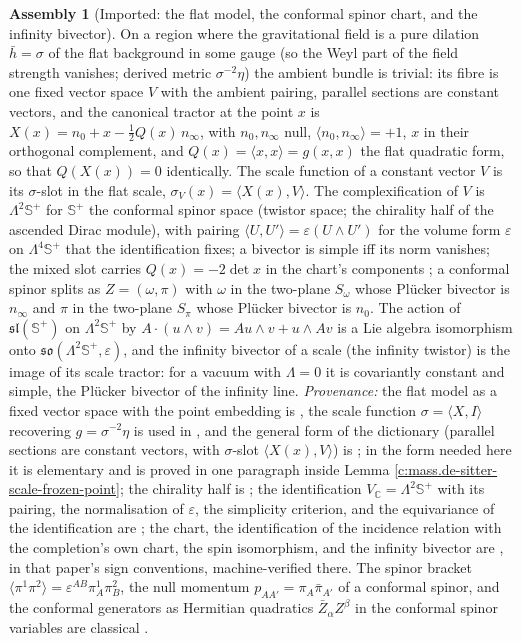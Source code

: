 \documentclass[11pt]{article}
\theoremstyle{definition}
\newtheorem{assembled}[theorem]{Assembly}
\theoremstyle{plain}
\newcommand{\changedmark}[2]{\marginpar{\raggedright\scriptsize\color{#1}#2}}
\providecommand{\C}{}\renewcommand{\C}{\mathbb{C}}
\providecommand{\CS}{}\renewcommand{\CS}{{\mathbb{S}^{+}}}
\providecommand{\Som}{}\renewcommand{\Som}{S_\omega}
\providecommand{\Spi}{}\renewcommand{\Spi}{S_\pi}
\providecommand{\hb}{}\renewcommand{\hb}{\bar{h}}
\providecommand{\br}{}\renewcommand{\br}[1]{\langle #1\rangle}
\providecommand{\ip}{}\renewcommand{\ip}[2]{\langle #1, #2\rangle}
\begin{document}
\begin{assembled}[Imported: the flat model, the conformal spinor chart, and the infinity bivector]\label{c:mass.imported-flat-model-twistor-chart-infinity}
\changedmark{gray}{reworded}
On a region where the gravitational field is a pure dilation $\hb = \sigma$ of the flat background in some gauge (so the Weyl part of the field strength vanishes; derived metric $\sigma^{-2}\eta$) the ambient bundle is trivial: its fibre is one fixed vector space $V$ with the ambient pairing, parallel sections are constant vectors, and the canonical tractor at the point $x$ is $X(x) = n_{0} + x - \tfrac12 Q(x)\, n_{\infty}$, with $n_{0}, n_{\infty}$ null, $\ip{n_{0}}{n_{\infty}} = +1$, $x$ in their orthogonal complement, and $Q(x) = \ip{x}{x} = g(x,x)$ the flat quadratic form, so that $Q(X(x)) = 0$ identically. The scale function of a constant vector $V$ is its $\sigma$-slot in the flat scale, $\sigma_{V}(x) = \ip{X(x)}{V}$. The complexification of $V$ is $\Lambda^{2}\CS$ for $\CS$ the conformal spinor space (twistor space; the chirality half of the ascended Dirac module), with pairing $\ip{U}{U'} = \varepsilon(U \wedge U')$ for the volume form $\varepsilon$ on $\Lambda^{4}\CS$ that the identification fixes; a bivector is simple iff its norm vanishes; the mixed slot carries $Q(x) = -2\det x$ in the chart's components \cite[Thm.~4.2(2)]{ButlerT9}; a conformal spinor splits as $Z = (\omega, \pi)$ with $\omega$ in the two-plane $\Som$ whose Pl\"ucker bivector is $n_{\infty}$ and $\pi$ in the two-plane $\Spi$ whose Pl\"ucker bivector is $n_{0}$. The action of $\mathfrak{sl}(\CS)$ on $\Lambda^{2}\CS$ by $A\cdot(u \wedge v) = Au \wedge v + u \wedge Av$ is a Lie algebra isomorphism onto $\mathfrak{so}(\Lambda^{2}\CS, \varepsilon)$, and the infinity bivector of a scale (the infinity twistor) is the image of its scale tractor: for a vacuum with $\Lambda = 0$ it is covariantly constant and simple, the Pl\"ucker bivector of the infinity line. \emph{Provenance:} the flat model as a fixed vector space with the point embedding is \cite[\S4.2]{ButlerT6}, the scale function $\sigma = \ip{X}{I}$ recovering $g = \sigma^{-2}\eta$ is used in \cite[Lem.~4.8]{ButlerT6}, and the general form of the dictionary (parallel sections are constant vectors, with $\sigma$-slot $\ip{X(x)}{V}$) is \cite[\S2]{BEG1994}; in the form needed here it is elementary and is proved in one paragraph inside Lemma \ref{c:mass.de-sitter-scale-frozen-point}; the chirality half is \cite[Thm.~3.1]{ButlerT9}; the identification $V_{\C} = \Lambda^{2}\CS$ with its pairing, the normalisation of $\varepsilon$, the simplicity criterion, and the equivariance of the identification are \cite[Thm.~3.4]{ButlerT9}; the chart, the identification of the incidence relation with the completion's own chart, the spin isomorphism, and the infinity bivector are \cite[Thm.~4.2, Cor.~4.8, Prop.~5.2]{ButlerT9}, in that paper's sign conventions, machine-verified there. The spinor bracket $\br{\pi^{1}\pi^{2}} = \varepsilon^{AB}\pi^{1}_{A}\pi^{2}_{B}$, the null momentum $p_{AA'} = \pi_{A}\bar\pi_{A'}$ of a conformal spinor, and the conformal generators as Hermitian quadratics $\bar{Z}_{\alpha}Z^{\beta}$ in the conformal spinor variables are classical \cite{PenroseRindler1986, Hughston1979}.
\end{assembled}
\end{document}

